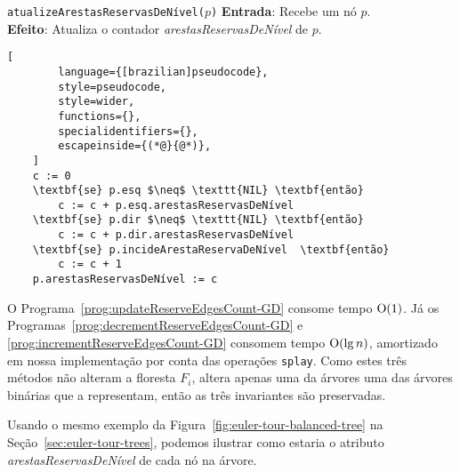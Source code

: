 \begin{programruledcaption}{\texttt{atualizeArestasReservasDeNível($p$)} \label{prog:updateReserveEdgesCount-GD}}
    \noindent\textbf{Entrada}: Recebe um nó $p$.
    \\
    \noindent\textbf{Efeito}: Atualiza o contador \textit{arestasReservasDeNível} de $p$.
    \vspace{-0.5\baselineskip}
    \begin{lstlisting}[
        language={[brazilian]pseudocode},
        style=pseudocode,
        style=wider,
        functions={},
        specialidentifiers={},
        escapeinside={(*@}{@*)},
    ]
    c := 0
    \textbf{se} p.esq $\neq$ \texttt{NIL} \textbf{então}
        c := c + p.esq.arestasReservasDeNível
    \textbf{se} p.dir $\neq$ \texttt{NIL} \textbf{então}
        c := c + p.dir.arestasReservasDeNível
    \textbf{se} p.incideArestaReservaDeNível  \textbf{então}
        c := c + 1
    p.arestasReservasDeNível := c
    \end{lstlisting}
    \vspace{-0.5\baselineskip}
\end{programruledcaption}

O Programa~\ref{prog:updateReserveEdgesCount-GD} consome tempo $\mathrm{O}(1)$. Já os Programas~\ref{prog:decrementReserveEdgesCount-GD} e \ref{prog:incrementReserveEdgesCount-GD} consomem tempo $\mathrm{O}(\lg n)$, amortizado em nossa implementação por conta das operações \texttt{splay}. Como estes três métodos não alteram a floresta $F_i$, altera apenas uma da árvores uma das árvores binárias que a representam, então as três invariantes são preservadas. 

Usando o mesmo exemplo da Figura~\ref{fig:euler-tour-balanced-tree} na Seção~\ref{sec:euler-tour-trees}, podemos ilustrar como estaria o atributo \textit{arestasReservasDeNível} de cada nó na árvore.

